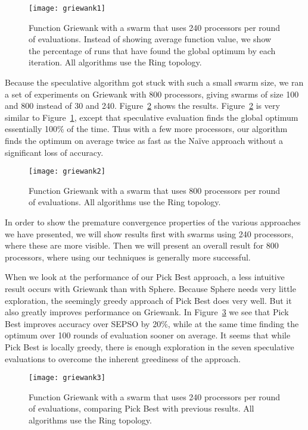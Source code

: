 \documentclass[smallcondensed]{svjour3}
\newcommand{\fig}[1]{Figure~\ref{fig:#1}}
\begin{document}
\begin{figure}
  \centering
  \texttt{[image: griewank1]}
  \caption{Function Griewank with a swarm that uses 240 processors per round of
  evaluations.  Instead of showing average function value, we show the
  percentage of runs that have found the global optimum by each iteration.  All
  algorithms use the Ring topology.}
  \label{fig:basic-griewank1}
\end{figure}

Because the speculative algorithm got stuck with such a small swarm size, we
ran a set of experiments on Griewank with 800 processors, giving swarms of size
100 and 800 instead of 30 and 240.  \fig{basic-griewank2} shows the results.
\fig{basic-griewank2} is very similar to \fig{basic-griewank1}, except that
speculative evaluation finds the global optimum essentially 100\% of the time.
Thus with a few more processors, our algorithm finds the optimum on average
twice as fast as the Na\"ive approach without a significant loss of accuracy.

\begin{figure}
  \centering
  \texttt{[image: griewank2]}
  \caption{Function Griewank with a swarm that uses 800 processors per round of
  evaluations.  All algorithms use the Ring topology.}
  \label{fig:basic-griewank2}
\end{figure}

In order to show the premature convergence properties of the various approaches
we have presented, we will show results first with swarms using 240 processors,
where these are more visible.  Then we will present an overall result for 800
processors, where using our techniques is generally more successful.

When we look at the performance of our Pick Best approach, a less intuitive
result occurs with Griewank than with Sphere.  Because Sphere needs very little
exploration, the seemingly greedy approach of Pick Best does very well.  But it
also greatly improves performance on Griewank.  In \fig{griewank-pickbest} we
see that Pick Best improves accuracy over SEPSO by 20\%, while at the same time
finding the optimum over 100 rounds of evaluation sooner on average.  It seems
that while Pick Best is locally greedy, there is enough exploration in the
seven speculative evaluations to overcome the inherent greediness of the
approach.

\begin{figure}
  \centering
  \texttt{[image: griewank3]}
  \caption{Function Griewank with a swarm that uses 240 processors per round of
  evaluations, comparing Pick Best with previous results.  All algorithms use
  the Ring topology.}
  \label{fig:griewank-pickbest}
\end{figure}
\end{document}
